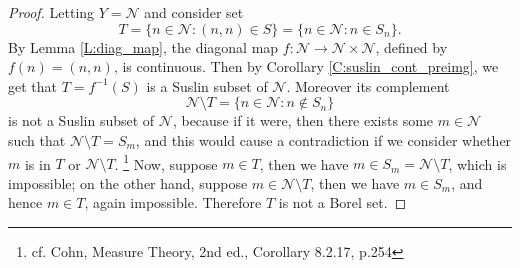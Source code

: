 \begin{proof}
Letting $Y=\mathcal{N}$ and consider set
\[
  T = \{ n\in\mathcal{N}: (n,n)\in S \}
    = \{ n\in\mathcal{N}: n\in S_n \}.
\]
By Lemma \ref{L:diag_map}, the diagonal map 
$f:\mathcal{N}\to\mathcal{N}\times\mathcal{N}$, defined by $f(n)=(n,n)$,
is continuous. Then by Corollary \ref{C:suslin_cont_preimg}, we get that
$T=f^{-1}(S)$ is a Suslin subset of $\mathcal{N}$.
Moreover its complement
\[
  \mathcal{N}\setminus T = \{ n\in\mathcal{N}: n\notin S_n \}
\]
is not a Suslin subset of $\mathcal{N}$, because if it were, then
there exists some $m\in \mathcal{N}$ such that 
$\mathcal{N}\setminus T=S_m$, and this would cause a contradiction
if we consider whether $m$ is in $T$ or $\mathcal{N}\setminus T$.
\footnote{cf. Cohn, Measure Theory, 2nd ed., Corollary 8.2.17, p.254}
Now, suppose $m\in T$, then we have $m\in S_m=\mathcal{N}\setminus T$,
which is impossible; on the other hand, suppose
$m\in \mathcal{N}\setminus T$, then we have $m\in S_m$, and hence
$m\in T$, again impossible. Therefore $T$ is not a Borel set.
\end{proof}

